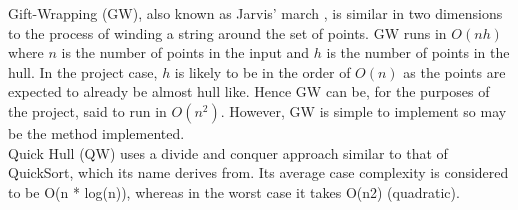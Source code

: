 Gift-Wrapping (GW), also known as Jarvis' march \cite{Jarvis1973}, is similar in two dimensions to the process of winding a string around the set of points. 
GW runs in $O(nh)$  \cite{Cormen2001} where $n$ is the number of points in the input and $h$ is the number of points in the hull. In the project case, $h$ is likely to be in the order of $O(n)$ as the points are expected to already be almost hull like. 
Hence GW can be, for the purposes of the project, said to run in $O(n^2)$. However, GW is simple to implement so may be the method implemented.\\

Quick Hull (QW) uses a divide and conquer approach similar to that of QuickSort, which its name derives from. Its average case complexity is considered to be O(n * log(n)), whereas in the worst case it takes O(n2) (quadratic).




